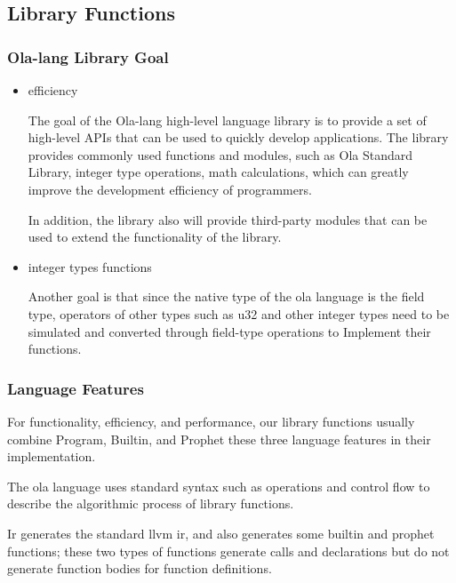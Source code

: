 \subsection{Library Functions}

\subsubsection{Ola-lang Library Goal}

\begin{itemize}
    \item efficiency

    The goal of the Ola-lang high-level language library is to provide a set of high-level APIs that can be used to quickly develop applications.
The library provides commonly used functions and modules, such as Ola Standard Library, integer type operations, math calculations,
which can greatly improve the development efficiency of programmers.

    In addition, the library also will provide third-party modules that can be used to extend the functionality of the library.
    \item  integer types functions

    Another goal is that since the native type of the ola language is the field type,
operators of other types such as u32 and other integer types need to be simulated and converted through field-type operations to Implement their functions.
\end{itemize}

\subsubsection{Language Features}
    For functionality, efficiency, and performance, our library functions usually combine Program, Builtin, and Prophet these three language features in their implementation.

    The ola language uses standard syntax such as operations and control flow to describe the algorithmic process of library functions.

    Ir generates the standard llvm ir, and also generates some builtin and prophet functions; these two types of functions generate calls and declarations but do not generate function bodies for function definitions.

